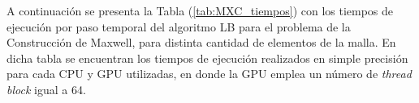 A continuación se presenta la Tabla (\ref{tab:MXC_tiempos}) con los tiempos de ejecución por paso temporal del algoritmo LB para el problema de la Construcción de Maxwell, para distinta cantidad de elementos de la malla. En dicha tabla se encuentran los tiempos de ejecución realizados en simple precisión para cada CPU y GPU utilizadas, en donde la GPU emplea un número de \textit{thread block} igual a 64.

\begin{table}[H]
	\centering
\end{table}
